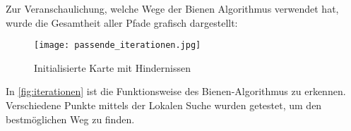 Zur Veranschaulichung, welche Wege der Bienen Algorithmus verwendet hat, wurde die Gesamtheit aller Pfade grafisch dargestellt:
\begin{figure}[H]
    \centering
    \texttt{[image: passende\_iterationen.jpg]}
    \caption{Initialisierte Karte mit Hindernissen\\}   
    \label{fig:iterationen}
\end{figure}

In \autoref{fig:iterationen} ist die Funktionsweise des Bienen-Algorithmus zu erkennen. Verschiedene Punkte mittels der Lokalen Suche wurden getestet, um den bestmöglichen Weg zu finden.